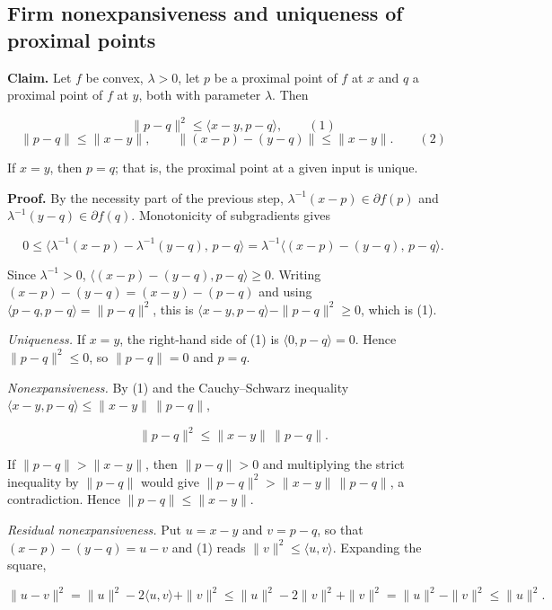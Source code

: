 \documentclass[11pt,a4paper]{report}
\begin{document}
\subsection{\texorpdfstring{Firm nonexpansiveness and uniqueness of proximal points}{Firm nonexpansiveness and uniqueness of proximal points}}
\label{report-step-ProximalLangevin-Proximal-lean-3}


\textbf{Claim.} Let \(f\) be convex, \(\lambda>0\), let \(p\) be a proximal point of \(f\) at \(x\) and \(q\) a proximal point of \(f\) at \(y\), both with parameter \(\lambda\). Then


\[\|p-q\|^2\le\langle x-y,p-q\rangle,\qquad(1)\]
\[\|p-q\|\le\|x-y\|,\qquad\|(x-p)-(y-q)\|\le\|x-y\|.\qquad(2)\]


If \(x=y\), then \(p=q\); that is, the proximal point at a given input is unique.




\textbf{Proof.} By the necessity part of the previous step, \(\lambda^{-1}(x-p)\in\partial f(p)\) and \(\lambda^{-1}(y-q)\in\partial f(q)\). Monotonicity of subgradients gives


\[0\le\bigl\langle\lambda^{-1}(x-p)-\lambda^{-1}(y-q),\,p-q\bigr\rangle=\lambda^{-1}\bigl\langle(x-p)-(y-q),\,p-q\bigr\rangle.\]


Since \(\lambda^{-1}>0\), \(\langle(x-p)-(y-q),p-q\rangle\ge0\). Writing \((x-p)-(y-q)=(x-y)-(p-q)\) and using \(\langle p-q,p-q\rangle=\|p-q\|^2\), this is \(\langle x-y,p-q\rangle-\|p-q\|^2\ge0\), which is (1).




\emph{Uniqueness.} If \(x=y\), the right-hand side of (1) is \(\langle0,p-q\rangle=0\). Hence \(\|p-q\|^2\le0\), so \(\|p-q\|=0\) and \(p=q\).




\emph{Nonexpansiveness.} By (1) and the Cauchy–Schwarz inequality \(\langle x-y,p-q\rangle\le\|x-y\|\,\|p-q\|\),


\[\|p-q\|^2\le\|x-y\|\,\|p-q\|.\]


If \(\|p-q\|>\|x-y\|\), then \(\|p-q\|>0\) and multiplying the strict inequality by \(\|p-q\|\) would give \(\|p-q\|^2>\|x-y\|\,\|p-q\|\), a contradiction. Hence \(\|p-q\|\le\|x-y\|\).




\emph{Residual nonexpansiveness.} Put \(u=x-y\) and \(v=p-q\), so that \((x-p)-(y-q)=u-v\) and (1) reads \(\|v\|^2\le\langle u,v\rangle\). Expanding the square,


\[\|u-v\|^2=\|u\|^2-2\langle u,v\rangle+\|v\|^2\le\|u\|^2-2\|v\|^2+\|v\|^2=\|u\|^2-\|v\|^2\le\|u\|^2.\]
\end{document}
